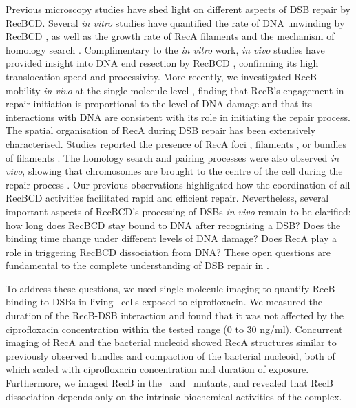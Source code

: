 Previous microscopy studies have shed light on different aspects of DSB repair by RecBCD. Several \emph{in vitro} studies have quantified the rate of DNA unwinding by RecBCD \cite{Spies2003,Liu2013}, as well as the growth rate of RecA filaments \cite{Joo2006,Galletto2006,Handa2009} and the mechanism of homology search \cite{Forget2012,Ragunathan2012}. Complimentary to the \emph{in vitro} work, \emph{in vivo} studies have provided insight into DNA end resection by RecBCD \cite{Wiktor2018}, confirming its high translocation speed and processivity. More recently, we investigated RecB mobility \emph{in vivo} at the single-molecule level \cite{Lepore2023}, finding that RecB's engagement in repair initiation is proportional to the level of DNA damage and that its interactions with DNA are consistent with its role in initiating the repair process. The spatial organisation of RecA during DSB repair has been extensively characterised. Studies reported the presence of RecA foci \cite{Renzette2005,Renzette2007,Centore2007,Amarh2018}, filaments \cite{Kidane2005}, or bundles of filaments \cite{Lesterlin2013,Ghodke2019}. The homology search and pairing processes were also observed \emph{in vivo}, showing that chromosomes are brought to the centre of the cell during the repair process \cite{Badrinarayanan2015,Wiktor2021}. Our previous observations \cite{Lepore2023} highlighted how the coordination of all RecBCD activities facilitated rapid and efficient repair. Nevertheless, several important aspects of RecBCD's processing of DSBs \emph{in vivo} remain to be clarified: how long does RecBCD stay bound to DNA after recognising a DSB? Does the binding time change under different levels of DNA damage? Does RecA play a role in triggering RecBCD dissociation from DNA? These open questions are fundamental to the complete understanding of DSB repair in \ecoli.

To address these questions, we used single-molecule imaging to quantify RecB binding to DSBs in living \ecoli\ cells exposed to ciprofloxacin. We measured the duration of the RecB-DSB interaction and found that it was not affected by the ciprofloxacin concentration within the tested range (0 to 30 ng/ml). Concurrent imaging of RecA and the bacterial nucleoid showed RecA structures similar to previously observed bundles and compaction of the bacterial nucleoid, both of which scaled with ciprofloxacin concentration and duration of exposure. Furthermore, we imaged RecB in the \dreca\ and \geneteneighty\ mutants, and revealed that RecB dissociation depends only on the intrinsic biochemical activities of the complex.
